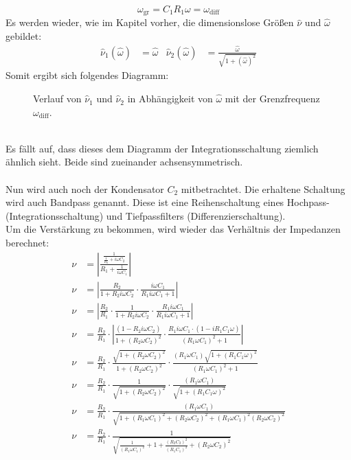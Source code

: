 \begin{equation}
    \omega_\text{gr}=C_1R_1\omega=\omega_\text{diff}
\end{equation}
Es werden wieder, wie im Kapitel vorher, die dimensionslose Größen $\hat{\nu}$ und $\hat{\omega}$ gebildet:
\begin{align}
    \hat{\nu}_1(\hat{\omega})&=\hat{\omega}&\hat{\nu}_2(\hat{\omega})&=\frac{\hat{\omega}}{\sqrt{1+\left(\hat{\omega}\right)^2}}
\end{align}\newpage
Somit ergibt sich folgendes Diagramm:
\begin{figure}[h]
    \centering\scalebox{0.85}{}
    \caption{Verlauf von $\hat{\nu}_1$ und $\hat{\nu}_2$ in Abhängigkeit von $\hat{\omega}$ mit der Grenzfrequenz $\omega_\text{diff}$.}
\end{figure}\\
Es fällt auf, dass dieses dem Diagramm der Integrationsschaltung ziemlich ähnlich sieht. Beide sind zueinander achsensymmetrisch.\\\\
Nun wird auch noch der Kondensator $C_2$ mitbetrachtet.
Die erhaltene Schaltung wird auch Bandpass genannt.
Diese ist eine Reihenschaltung eines Hochpass- (Integrationsschaltung) und Tiefpassfilters (Differenzierschaltung).\\
Um die Verstärkung zu bekommen, wird wieder das Verhältnis der Impedanzen berechnet:
\begin{align}
    \nu&=\left|\frac{\frac{1}{\frac{1}{R_2}+i\omega C_2}}{R_1+\frac{1}{i\omega C_1}}\right|\\
    \nu&=\left|\frac{R_2}{1+R_2i\omega C_2}\cdot\frac{i\omega C_1}{R_1i\omega C_1+1}\right|\\
    \nu&=\left|\frac{R_2}{R_1}\cdot\frac{1}{1+R_2i\omega C_2}\cdot\frac{R_1i\omega C_1}{R_1i\omega C_1+1}\right|\\
    \nu&=\frac{R_2}{R_1}\cdot\left|\frac{\left(1-R_2i\omega C_2\right)}{1+\left(R_2\omega C_2\right)^2}\cdot\frac{R_1i\omega C_1\cdot\left(1-iR_1C_1\omega\right)}{\left(R_1\omega C_1\right)^2+1}\right|\\
    \nu&=\frac{R_2}{R_1}\cdot\frac{\sqrt{1+\left(R_2\omega C_2\right)^2}}{1+\left(R_2\omega C_2\right)^2}\cdot\frac{\left(R_1\omega C_1\right)\sqrt{1+\left(R_1C_1\omega\right)^2}}{\left(R_1\omega C_1\right)^2+1}\\
    \nu&=\frac{R_2}{R_1}\cdot\frac{1}{\sqrt{1+\left(R_2\omega C_2\right)^2}}\cdot\frac{\left(R_1\omega C_1\right)}{\sqrt{1+\left(R_1C_1\omega\right)^2}}\\
    \nu&=\frac{R_2}{R_1}\cdot\frac{\left(R_1\omega C_1\right)}{\sqrt{1+\left(R_1\omega C_1\right)^2+\left(R_2\omega C_2\right)^2+\left(R_1\omega C_1\right)^2\left(R_2\omega C_2\right)^2}}\\
    \nu&=\frac{R_2}{R_1}\cdot\frac{1}{\sqrt{\frac{1}{\left(R_1\omega C_1\right)^2}+1+\frac{\left(R_2C_2\right)^2}{\left(R_1C_1\right)^2}+\left(R_2\omega C_2\right)^2}}
\end{align}
